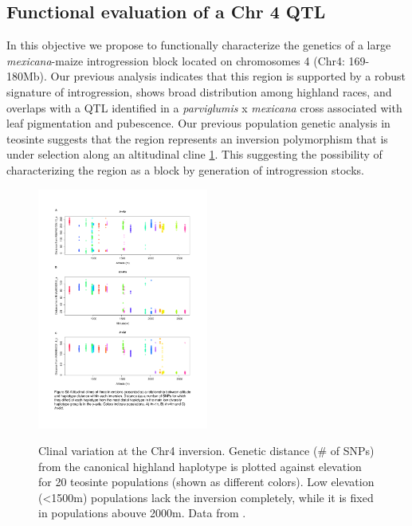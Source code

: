 \subsection{Functional evaluation of a Chr 4 QTL} \label{subsec:nils}

In this objective we propose to functionally characterize the genetics of a large \emph{mexicana}-maize introgression block located on chromosomes 4 (Chr4: 169-180Mb). Our previous analysis \citep{Hufford2013} indicates that this region is supported by a robust signature of introgression, shows broad distribution among highland races, and overlaps with a QTL identified in a \emph{parviglumis} x \emph{mexicana} cross  \citep{Lauter2004a} associated with leaf pigmentation and pubescence. Our previous population genetic analysis in teosinte \citep{Pyhajarvi2013}  suggests that the region represents an inversion polymorphism that is under selection along an altitudinal cline \ref{fig:cline}.  This suggesting the possibility of characterizing the region as a block by generation of introgression stocks.

\begin{figure}
  \centering
  \caption{Clinal variation at the Chr4 inversion. Genetic distance (\# of SNPs) from the canonical highland haplotype is plotted against elevation for 20 teosinte populations (shown as different colors).  Low elevation (<1500m) populations lack the inversion completely, while it is fixed in populations abouve 2000m. Data from \citet{Pyhajarvi2013}. } 
   \includegraphics[width=0.5\textwidth]{chr4.pdf}
\label{fig:cline}
\end{figure}

